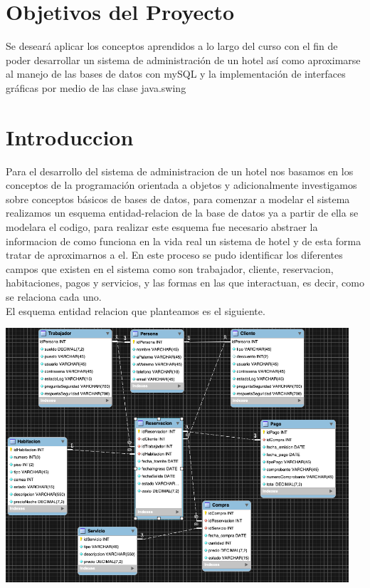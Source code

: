 \documentclass[a4paper,12pt]{article}
\begin{document}
\vspace{4cm}
\begin{flushleft}

\section{Objetivos del Proyecto}
\textsf{Se deseará aplicar los conceptos aprendidos a lo largo del curso con el fin de poder desarrollar un sistema de administración de un hotel así como aproximarse al manejo de las bases de datos con mySQL y la implementación de interfaces gráficas por medio de las clase java.swing}

\section{Introduccion}
\textsf{Para el desarrollo del sistema de administracion de un hotel nos basamos en los conceptos de la programación orientada a objetos y adicionalmente investigamos sobre conceptos básicos de bases de datos, para comenzar a modelar el sistema realizamos un esquema entidad-relacion de la base de datos ya a partir de ella se modelara el codigo, para realizar este esquema fue necesario abstraer la informacion de como funciona en la vida real un sistema de hotel y de esta forma tratar de aproximarnos a el. En este proceso se pudo identificar los diferentes campos que existen en el sistema como son trabajador, cliente, reservacion, habitaciones, pagos y servicios, y las formas en las que interactuan, es decir, como se relaciona cada uno.\\
El esquema entidad relacion que planteamos es el siguiente.}

\vspace{0.5cm}
\begin{center}
\includegraphics[width=12.75cm]{1.png}
\end{center}


\end{flushleft}
\end{document}
